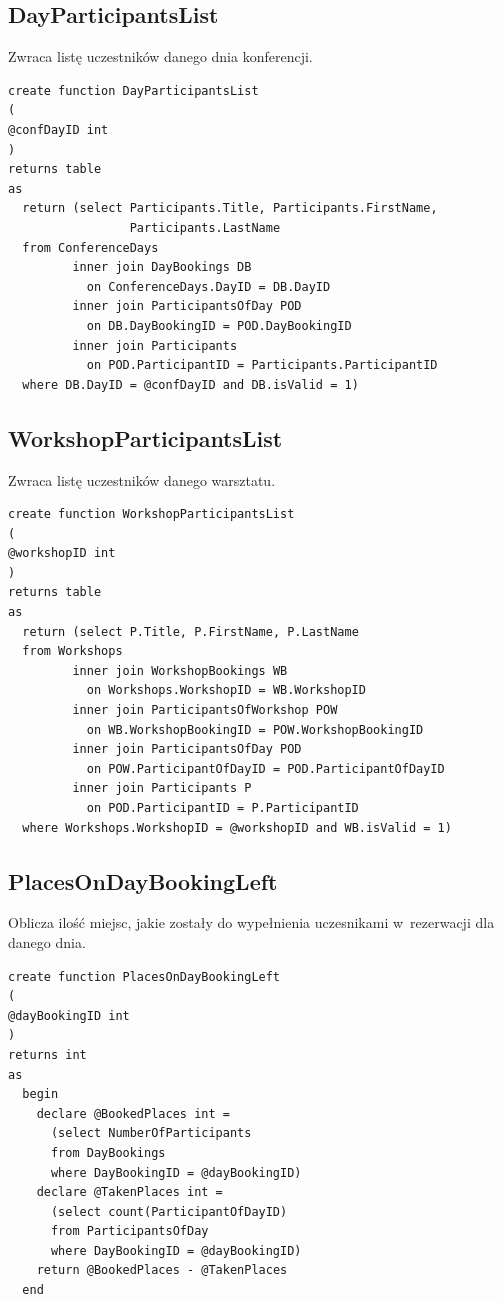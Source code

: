 \documentclass[12pt, a4paper]{mwrep}
\begin{document}
\newpage
\subsection{DayParticipantsList}

\noindent Zwraca listę uczestników danego dnia konferencji.

\begin{lstlisting}
create function DayParticipantsList
(
@confDayID int
)
returns table
as
  return (select Participants.Title, Participants.FirstName, 
                 Participants.LastName
  from ConferenceDays
         inner join DayBookings DB
           on ConferenceDays.DayID = DB.DayID
         inner join ParticipantsOfDay POD
           on DB.DayBookingID = POD.DayBookingID
         inner join Participants
           on POD.ParticipantID = Participants.ParticipantID
  where DB.DayID = @confDayID and DB.isValid = 1)
\end{lstlisting}

\subsection{WorkshopParticipantsList}

\noindent Zwraca listę uczestników danego warsztatu.

\begin{lstlisting}
create function WorkshopParticipantsList
(
@workshopID int
)
returns table
as
  return (select P.Title, P.FirstName, P.LastName
  from Workshops
         inner join WorkshopBookings WB
           on Workshops.WorkshopID = WB.WorkshopID
         inner join ParticipantsOfWorkshop POW
           on WB.WorkshopBookingID = POW.WorkshopBookingID
         inner join ParticipantsOfDay POD
           on POW.ParticipantOfDayID = POD.ParticipantOfDayID
         inner join Participants P
           on POD.ParticipantID = P.ParticipantID
  where Workshops.WorkshopID = @workshopID and WB.isValid = 1)
\end{lstlisting}

\subsection{PlacesOnDayBookingLeft}

\noindent Oblicza ilość miejsc, jakie zostały do wypełnienia uczesnikami w~rezerwacji dla danego dnia.
\begin{lstlisting}
create function PlacesOnDayBookingLeft
(
@dayBookingID int
)
returns int
as
  begin
    declare @BookedPlaces int = 
      (select NumberOfParticipants 
      from DayBookings 
      where DayBookingID = @dayBookingID)
    declare @TakenPlaces int = 
      (select count(ParticipantOfDayID) 
      from ParticipantsOfDay 
      where DayBookingID = @dayBookingID)
    return @BookedPlaces - @TakenPlaces
  end
\end{lstlisting}
\end{document}
